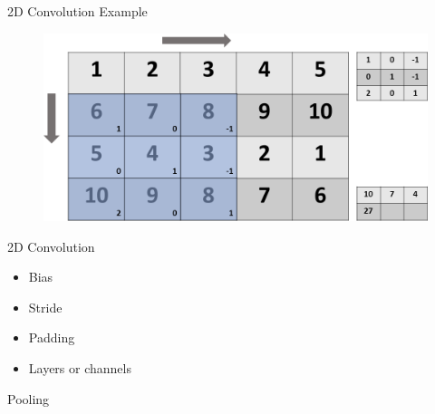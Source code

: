 \begin{frame}{2D Convolution Example}
	\begin{figure}
		\includegraphics[width=.7\textwidth, center]{figures/conv-slide5-cropped}
	\end{figure}
\end{frame}

\begin{frame}{2D Convolution} 
	\begin{itemize}
		\item Bias 
		\item Stride 
		\item Padding 
		\item Layers or channels 
	\end{itemize}
\end{frame}
\begin{frame}{Pooling}
\end{frame}
